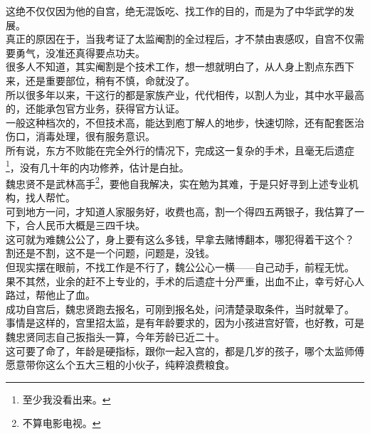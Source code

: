 \begin{multicols}{\theparacolNo}
这绝不仅仅因为他的自宫，绝无混饭吃、找工作的目的，而是为了中华武学的发展。\\

真正的原因在于，当我考证了太监阉割的全过程后，才不禁由衷感叹，自宫不仅需要勇气，没准还真得要点功夫。\\

很多人不知道，其实阉割是个技术工作，想一想就明白了，从人身上割点东西下来，还是重要部位，稍有不慎，命就没了。\\

所以很多年以来，干这行的都是家族产业，代代相传，以割人为业，其中水平最高的，还能承包官方业务，获得官方认证。\\

一般这种档次的，不但技术高，能达到庖丁解人的地步，快速切除，还有配套医治伤口，消毒处理，很有服务意识。\\

所有说，东方不败能在完全外行的情况下，完成这一复杂的手术，且毫无后遗症\footnote{至少我没看出来。}，没有几十年的内功修养，估计是白扯。\\

魏忠贤不是武林高手\footnote{不算电影电视。}，要他自我解决，实在勉为其难，于是只好寻到上述专业机构，找人帮忙。\\

可到地方一问，才知道人家服务好，收费也高，割一个得四五两银子，我估算了一下，合人民币大概是三四千块。\\

这可就为难魏公公了，身上要有这么多钱，早拿去赌博翻本，哪犯得着干这个？\\

割还是不割，这不是一个问题，问题是，没钱。\\

但现实摆在眼前，不找工作是不行了，魏公公心一横——自己动手，前程无忧。\\

果不其然，业余的赶不上专业的，手术的后遗症十分严重，出血不止，幸亏好心人路过，帮他止了血。\\

成功自宫后，魏忠贤跑去报名，可刚到报名处，问清楚录取条件，当时就晕了。\\

事情是这样的，宫里招太监，是有年龄要求的，因为小孩进宫好管，也好教，可是魏忠贤同志自己扳指头一算，今年芳龄已近二十。\\

这可要了命了，年龄是硬指标，跟你一起入宫的，都是几岁的孩子，哪个太监师傅愿意带你这么个五大三粗的小伙子，纯粹浪费粮食。\\


\end{multicols}
